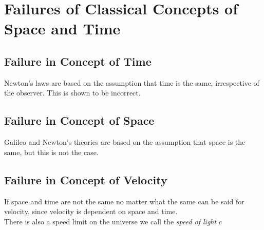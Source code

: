 \section{Failures of Classical Concepts of Space and Time}
\subsection{Failure in Concept of Time}
Newton's laws are based on the assumption that time is the same, irrespective of the observer. This is shown to be incorrect.
\subsection{Failure in Concept of Space}
Galileo and Newton's theories are based on the assumption that space is the same, but this is not the case. 
\subsection{Failure in Concept of Velocity}
If space and time are not the same no matter what the same can be said for velocity, since velocity is dependent on space and time. \\
There is also a speed limit on the universe we call the \textit{speed of light} $ c $